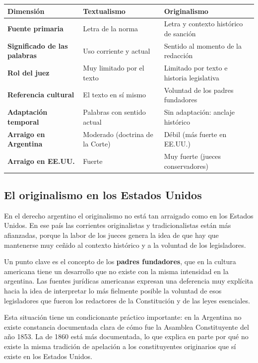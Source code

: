 \documentclass[12pt,oneside]{book}
\begin{document}
\begin{table}[H]
\centering
\small
\begin{tabularx}{\textwidth}{
    >{\raggedright\arraybackslash}p{}
    >{\raggedright\arraybackslash}X
    >{\raggedright\arraybackslash}X
}
\toprule
\textbf{Dimensión} & \textbf{Textualismo} & \textbf{Originalismo} \\
\midrule
\textbf{Fuente primaria} & Letra de la norma & Letra y contexto histórico de sanción \\
\textbf{Significado de las palabras} & Uso corriente y actual & Sentido al momento de la redacción \\
\textbf{Rol del juez} & Muy limitado por el texto & Limitado por texto e historia legislativa \\
\textbf{Referencia cultural} & El texto en sí mismo & Voluntad de los padres fundadores \\
\textbf{Adaptación temporal} & Palabras con sentido actual & Sin adaptación: anclaje histórico \\
\textbf{Arraigo en Argentina} & Moderado (doctrina de la Corte) & Débil (más fuerte en EE.UU.) \\
\textbf{Arraigo en EE.UU.} & Fuerte & Muy fuerte (jueces conservadores) \\
\bottomrule
\end{tabularx}
\end{table}

\subsection{El originalismo en los Estados Unidos}

En el derecho argentino el originalismo no está tan arraigado como en los Estados Unidos. En ese país las corrientes originalistas y tradicionalistas están más afianzadas, porque la labor de los jueces genera la idea de que hay que mantenerse muy ceñido al contexto histórico y a la voluntad de los legisladores.

Un punto clave es el concepto de los \textbf{padres fundadores}, que en la cultura americana tiene un desarrollo que no existe con la misma intensidad en la argentina. Las fuentes jurídicas americanas expresan una deferencia muy explícita hacia la idea de interpretar lo más fielmente posible la voluntad de esos legisladores que fueron los redactores de la Constitución y de las leyes esenciales.

Esta situación tiene un condicionante práctico importante: en la Argentina no existe constancia documentada clara de cómo fue la Asamblea Constituyente del año 1853. La de 1860 está más documentada, lo que explica en parte por qué no existe la misma tradición de apelación a los constituyentes originarios que sí existe en los Estados Unidos.
\end{document}
